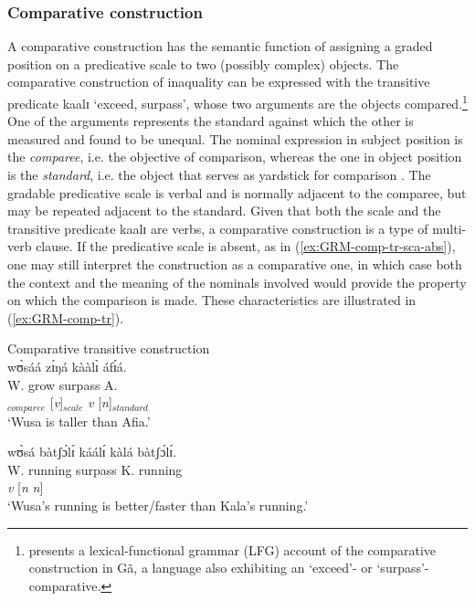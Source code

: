 \subsubsection{Comparative construction}
\label{sec:GRM-compar-ct}

A comparative construction has the semantic function of assigning a graded
position on a predicative scale to two (possibly complex) objects.
The comparative construction of inaquality can be expressed with the
transitive predicate {\sls kaalɪ} `exceed, surpass', whose  two arguments are
the objects compared.\footnote{\citet{Brin05} presents a lexical-functional
grammar (LFG)  account of the comparative construction in Gã, a language also
exhibiting an  `exceed'-  or `surpass'-comparative.}  One of the arguments 
represents the
standard
against which the other is
measured and found to be unequal.  The nominal expression in subject position is
the {\it comparee}, i.e. the objective of comparison, whereas the
one in object position is the {\it standard}, i.e. the object that
serves as yardstick for comparison \citep{Stas08}. The gradable
predicative scale is verbal and is normally adjacent to  the comparee, but may
be repeated adjacent to the standard. Given that both the scale and the
transitive predicate {\sls kaalɪ} are verbs, a comparative construction is  a
 type of multi-verb clause.  If the predicative scale is absent, as in
(\ref{ex:GRM-comp-tr-sca-abs}),  one
may still interpret the construction as a comparative one, in which case both
the
context
and the meaning of  the nominals involved would provide the property on which
the
comparison  is made. These characteristics are illustrated in
(\ref{ex:GRM-comp-tr}).


\ea\label{ex:GRM-comp-tr}{\rm Comparative transitive construction}\\
\ea\label{ex:GRM-comp-tr-sca-pres}{
\glll wʊ̀sáá zɪ́ŋá kààlɪ̀ áfɪ́á.\\
  W. grow surpass A.\\
[{\it n}]$_{comparee}$  [{\it v}]$_{scale}$ {\it v} [{\it n}]$_{standard}$\\
\glt `Wusa is taller than Afia.'
}

\ex\label{ex:GRM-comp-tr-sca-abs}{
\glll wʊ̀sá bàtʃɔ́lɪ́ káálɪ́ kàlá bàtʃɔ́lɪ́.\\
W.  running surpass K. running\\
[{\it n}  {\it n}]  {\it v} [{\it n} {\it n}]\\
\glt `Wusa's running is better/faster than Kala's running.'
}

